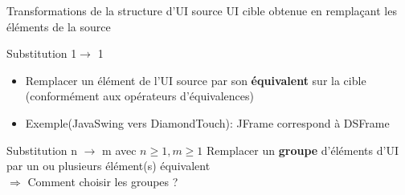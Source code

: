 \documentclass[11pt]{beamer}
\begin{document}
\begin{frame}[t]{ Transformations de la structure d'UI source}
{\scriptsize UI cible obtenue en remplaçant les éléments de la source}
\begin{block}{{\scriptsize  Substitution 1$ \rightarrow$ 1}}
\begin{itemize}
\item{\tiny Remplacer un élément de l'UI source par son \textbf{équivalent} sur la cible (conformément aux opérateurs d'équivalences)}
\item {\tiny Exemple(JavaSwing vers DiamondTouch): JFrame correspond à DSFrame}
\end{itemize}
\end{block}
\pause
\begin{block}{{\scriptsize Substitution n $ \rightarrow$ m } {\tiny avec $ n\geq 1, m\geq 1$ }}
{\tiny Remplacer un \textbf{groupe} d'éléments d'UI par un ou plusieurs élément(s) équivalent\\}
{\tiny $\Rightarrow$ Comment choisir les groupes ?}
\end{block}


\end{frame}
\end{document}
